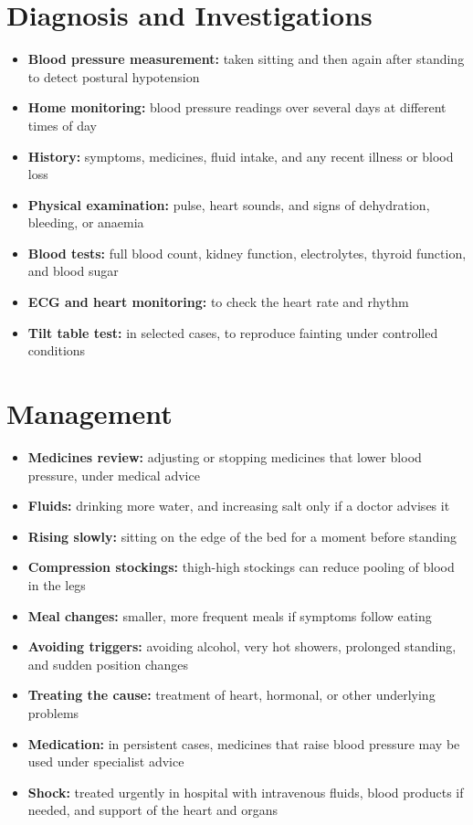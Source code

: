 \section*{Diagnosis and Investigations}
\begin{itemize}
    \item \textbf{Blood pressure measurement:} taken sitting and then again after standing to detect postural hypotension
    \item \textbf{Home monitoring:} blood pressure readings over several days at different times of day
    \item \textbf{History:} symptoms, medicines, fluid intake, and any recent illness or blood loss
    \item \textbf{Physical examination:} pulse, heart sounds, and signs of dehydration, bleeding, or anaemia
    \item \textbf{Blood tests:} full blood count, kidney function, electrolytes, thyroid function, and blood sugar
    \item \textbf{ECG and heart monitoring:} to check the heart rate and rhythm
    \item \textbf{Tilt table test:} in selected cases, to reproduce fainting under controlled conditions
\end{itemize}

\section*{Management}
\begin{itemize}
    \item \textbf{Medicines review:} adjusting or stopping medicines that lower blood pressure, under medical advice
    \item \textbf{Fluids:} drinking more water, and increasing salt only if a doctor advises it
    \item \textbf{Rising slowly:} sitting on the edge of the bed for a moment before standing
    \item \textbf{Compression stockings:} thigh-high stockings can reduce pooling of blood in the legs
    \item \textbf{Meal changes:} smaller, more frequent meals if symptoms follow eating
    \item \textbf{Avoiding triggers:} avoiding alcohol, very hot showers, prolonged standing, and sudden position changes
    \item \textbf{Treating the cause:} treatment of heart, hormonal, or other underlying problems
    \item \textbf{Medication:} in persistent cases, medicines that raise blood pressure may be used under specialist advice
    \item \textbf{Shock:} treated urgently in hospital with intravenous fluids, blood products if needed, and support of the heart and organs
\end{itemize}

